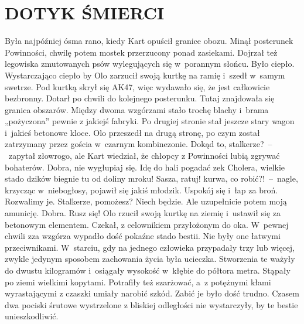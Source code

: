 \documentclass[../MAIN.tex]{subfiles}
\begin{document}
\section*{DOTYK ŚMIERCI}
\mm Była najpóźniej ósma rano, kiedy Kart opuścił granice obozu. Minął posterunek Powinności, chwilę potem mostek przerzucony ponad zasiekami. Dojrzał też legowiska zmutowanych psów wylegujących się w~porannym słońcu. Było ciepło. Wystarczająco ciepło by Olo zarzucił swoją kurtkę na ramię i~szedł w~samym swetrze. Pod kurtką skrył się AK47, więc wydawało się, że jest całkowicie bezbronny.
\pp
Dotarł po chwili do kolejnego posterunku. Tutaj znajdowała się granica obszarów. Między dwoma wzgórzami stało trochę blachy i~brama „pożyczona” pewnie z jakiejś fabryki. Po drugiej stronie stał jeszcze stary wagon i~jakieś betonowe kloce. Olo przeszedł na drugą stronę, po czym został zatrzymany przez gościa w~czarnym kombinezonie.
\sx Dokąd to, stalkerze?~--~zapytał złowrogo, ale Kart wiedział, że chłopcy z Powinności lubią zgrywać bohaterów.
\xx Dobra, nie wygłupiaj się. Idę do hali pogadać ze\3k
\xx Cholera, wielkie stado dzików biegnie tu od doliny mroku! Sasza, ratuj! kurwa, co robić?!~--~nagle, krzycząc w~niebogłosy, pojawił się jakiś młodzik.
\xx Uspokój się i~łap za broń. Rozwalimy je. Stalkerze, pomożesz?
\xx Niech będzie. Ale uzupełnicie potem moją amunicję.
\xx Dobra. Rusz się!
\qd
\hspace{9em}Olo rzucił swoją kurtkę na ziemię i~ustawił się za betonowym elementem. Czekał, z celownikiem przyłożonym do oka. W~pewnej chwili zza wzgórza wypadło dość pokaźne stado bestii. Nie były one łatwymi przeciwnikami. W~starciu, gdy na jednego człowieka przypadały trzy lub więcej, zwykle jedynym sposobem zachowania życia była ucieczka. Stworzenia te ważyły do dwustu kilogramów i~osiągały wysokość w~kłębie do półtora metra. Stąpały po ziemi wielkimi kopytami. Potrafiły też szarżować, a~z potężnymi kłami wyrastającymi z czaszki umiały narobić szkód. Zabić je było dość trudno. Czasem dwa pociski śrutowe wystrzelone z bliskiej odległości nie wystarczyły, by te bestie unieszkodliwić.
\end{document}

